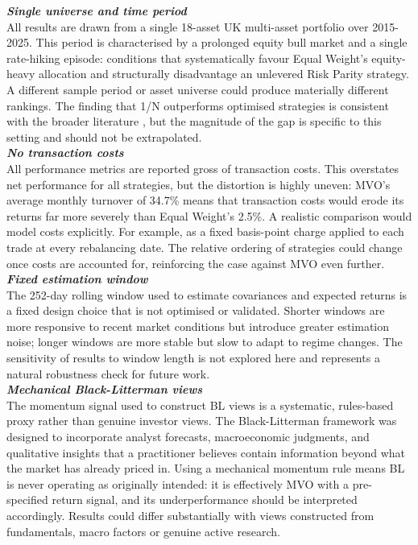 \documentclass[a4paper,alpha-refs]{scr-contemporary}
\numberwithin{equation}{section}
\begin{document}
\noindent\textbf{\emph{Single universe and time period}} \\
\indent All results are drawn from a single 18-asset UK multi-asset portfolio over
2015-2025. This period is characterised by a prolonged equity bull market and a
single rate-hiking episode: conditions that systematically favour Equal Weight's
equity-heavy allocation and structurally disadvantage an unlevered Risk Parity
strategy. \newline 
\indent A different sample period or asset universe could produce materially
different rankings. The finding that 1/N outperforms optimised strategies is
consistent with the broader literature \citep{demiguel_optimal_2009}, but the
magnitude of the gap is specific to this setting and should not be extrapolated. \\

\noindent\textbf{\emph{No transaction costs}} \\
\indent All performance metrics are reported gross of transaction costs. This
overstates net performance for all strategies, but the distortion is highly
uneven: MVO's average monthly turnover of 34.7\% means that transaction costs
would erode its returns far more severely than Equal Weight's 2.5\%. \newline 
\indent A realistic comparison would model costs explicitly. For example, as a fixed
basis-point charge applied to each trade at every rebalancing date. The relative
ordering of strategies could change once costs are accounted for, reinforcing
the case against MVO even further. \\

\noindent\textbf{\emph{Fixed estimation window}} \\
\indent The 252-day rolling window used to estimate covariances and expected
returns is a fixed design choice that is not optimised or validated. Shorter
windows are more responsive to recent market conditions but introduce greater
estimation noise; longer windows are more stable but slow to adapt to regime
changes. \newline 
\indent The sensitivity of results to window length is not explored here and
represents a natural robustness check for future work. \\

\noindent\textbf{\emph{Mechanical Black-Litterman views}} \\
\indent The momentum signal used to construct BL views is a systematic,
rules-based proxy rather than genuine investor views. The Black-Litterman
framework was designed to incorporate analyst forecasts, macroeconomic
judgments, and qualitative insights that a practitioner believes contain
information beyond what the market has already priced in. \newline 
\indent Using a mechanical momentum rule means BL is never operating as 
originally intended: it is effectively MVO with a pre-specified return signal, 
and its underperformance should be interpreted accordingly. \newline 
\indent Results could differ substantially with views constructed from fundamentals, 
macro factors or genuine active research. \\
\end{document}
